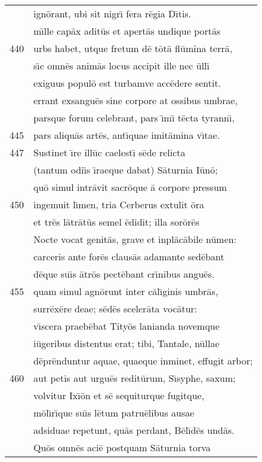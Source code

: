 \documentclass[paper=6in:9in,pagesize=pdftex,
               headinclude=on,footinclude=on,12pt]{scrbook}
\begin{document}
\begin{longtable}[p]{ r l }
 & ign\=orant, ubi sit nigr\={\i} fera r\=egia D\={\i}tis.\\ 
 & m\={\i}lle cap\=ax adit\=us et apert\=as undique port\=as\\ 
440 & urbs habet, utque fretum d\=e t\=ot\=a fl\=umina terr\=a,\\ 
 & s\={\i}c omn\=es anim\=as locus accipit ille nec \=ull\={\i}\\ 
 & exiguus popul\=o est turbamve acc\=edere sentit.\\ 
 & errant exsangu\=es sine corpore at ossibus umbrae,\\ 
 & parsque forum celebrant, pars \={\i}m\={\i} t\=ecta tyrann\={\i},\\ 
445 & pars aliqu\=as art\=es, ant\={\i}quae imit\=amina v\={\i}tae.\\ 
447 & \indent Sustinet \={\i}re ill\=uc caelest\={\i} s\=ede relicta\\ 
 & (tantum odi\={\i}s \={\i}raeque dabat) S\=aturnia I\=un\=o;\\ 
 & qu\=o simul intr\=avit sacr\=oque \=a corpore pressum\\ 
450 & ingemuit l\={\i}men, tria Cerberus extulit \=ora\\ 
 & et tr\=es l\=atr\=at\=us semel \=edidit; illa sor\=or\=es\\ 
 & Nocte vocat genit\=as, grave et inpl\=ac\=abile n\=umen:\\ 
 & carceris ante for\=es claus\=as adamante sed\=ebant\\ 
 & d\=eque su\={\i}s \=atr\=os pect\=ebant cr\={\i}nibus angu\=es.\\ 
455 & quam simul agn\=orunt inter c\=al\={\i}ginis umbr\=as,\\ 
 & surr\=ex\=ere deae; s\=ed\=es sceler\=ata voc\=atur:\\ 
 & v\={\i}scera praeb\=ebat Tity\=os lanianda novemque\\ 
 & i\=ugeribus distentus erat; tibi, Tantale, n\=ullae\\ 
 & d\=epr\=enduntur aquae, quaeque inminet, effugit arbor;\\ 
460 & aut petis aut urgu\=es redit\=urum, S\={\i}syphe, saxum;\\ 
 & volvitur Ix\={\i}\=on et s\=e sequiturque fugitque,\\ 
 & m\=ol\={\i}r\={\i}que su\={\i}s l\=etum patru\=elibus ausae\\ 
 & adsiduae repetunt, qu\=as perdant, B\=el\={\i}d\=es und\=as.\\ 
 & \indent Qu\=os omn\=es aci\=e postquam S\=aturnia torva\\ 

\end{longtable}
\end{document}
